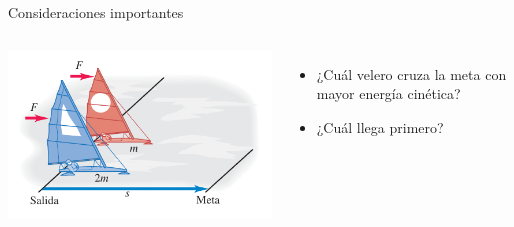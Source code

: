 \documentclass[9pt, aspectratio=169]{beamer}
\begin{document}
\begin{frame}{Consideraciones importantes}
    \begin{columns}
        \cx
        \begin{center}
            \includegraphics[width=1.0\textwidth]{figs/fig-09.png}
        \end{center}
        \cx
        \begin{itemize}
            \item ¿Cuál velero cruza la meta con mayor energía cinética?
            \item ¿Cuál llega primero?
        \end{itemize}
    \end{columns}
\end{frame}
\end{document}
